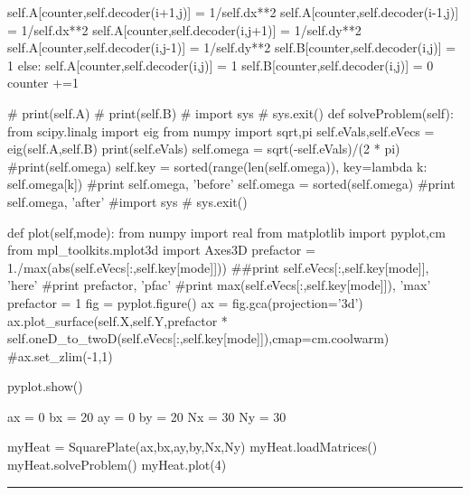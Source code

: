 \begin{enumerate}
\begin{codeexample}
\begin{VerbatimOut}{\listingFile}
                    self.A[counter,self.decoder(i+1,j)] = 1/self.dx**2 
                    self.A[counter,self.decoder(i-1,j)] = 1/self.dx**2 
                    self.A[counter,self.decoder(i,j+1)] = 1/self.dy**2 
                    self.A[counter,self.decoder(i,j-1)] = 1/self.dy**2 
                    self.B[counter,self.decoder(i,j)] = 1
                else:
                    self.A[counter,self.decoder(i,j)] = 1
                    self.B[counter,self.decoder(i,j)] = 0
                counter +=1

        
                #        print(self.A)
                #  print(self.B)
                #  import sys
                #  sys.exit()
    def solveProblem(self):
        from scipy.linalg import eig
        from numpy import sqrt,pi
        self.eVals,self.eVecs = eig(self.A,self.B)
        print(self.eVals)
        self.omega = sqrt(-self.eVals)/(2 * pi)
        #print(self.omega)
        self.key = sorted(range(len(self.omega)), key=lambda k: self.omega[k])
        #print self.omega, 'before'
        self.omega = sorted(self.omega)
        #print self.omega, 'after'
        #import sys
        # sys.exit()

    def plot(self,mode):
        from numpy import real
        from matplotlib import pyplot,cm
        from mpl_toolkits.mplot3d import Axes3D
        prefactor = 1./max(abs(self.eVecs[:,self.key[mode]]))
        ##print self.eVecs[:,self.key[mode]], 'here'
        #print prefactor, 'pfac'
        #print max(self.eVecs[:,self.key[mode]]), 'max'
        prefactor = 1
        fig = pyplot.figure()
        ax = fig.gca(projection='3d')
        ax.plot_surface(self.X,self.Y,prefactor * self.oneD_to_twoD(self.eVecs[:,self.key[mode]]),cmap=cm.coolwarm)
        #ax.set_zlim(-1,1)

        pyplot.show()


ax = 0
bx = 20
ay = 0
by = 20
Nx = 30
Ny = 30


myHeat = SquarePlate(ax,bx,ay,by,Nx,Ny)
myHeat.loadMatrices()
myHeat.solveProblem()
myHeat.plot(4)
\end{VerbatimOut}
\end{codeexample}
\else
\noindent\rule{5 in}{0.01 in}
\fi



\end{enumerate}
